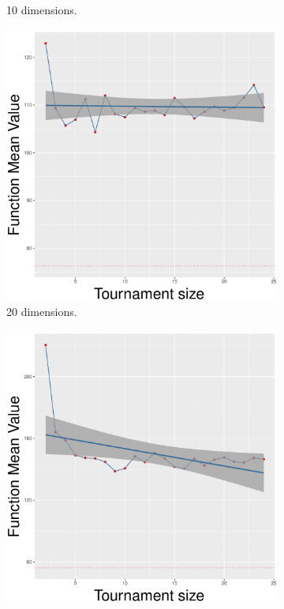 \begin{figure}[!t]
\begin{subfigure}[b]{0.33\textwidth}
		\caption{10 dimensions.}
	\end{subfigure}
	\begin{subfigure}[b]{0.33\textwidth}
		\centering
		\includegraphics[width=\textwidth]{img/uniform-20D/unimodal_uniform_11_dim_20.pdf}
		\caption{20 dimensions.}
	\end{subfigure}
	\begin{subfigure}[b]{0.33\textwidth}
		\centering
		\includegraphics[width=\textwidth]{img/uniform-40D/unimodal_uniform_11_dim_40.pdf}

\end{subfigure}
\end{figure}
